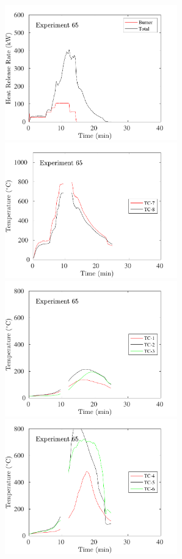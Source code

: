 \begin{figure}[H]
\includegraphics[height=2.30in]{../SCRIPT_FIGURES/Test_65_HRR} \hfill
\includegraphics[height=2.30in]{../SCRIPT_FIGURES/Test_65_TC_7-8} \\
\includegraphics[height=2.30in]{../SCRIPT_FIGURES/Test_65_TC_1-3} \hfill
\includegraphics[height=2.30in]{../SCRIPT_FIGURES/Test_65_TC_4-6}

\end{figure}
